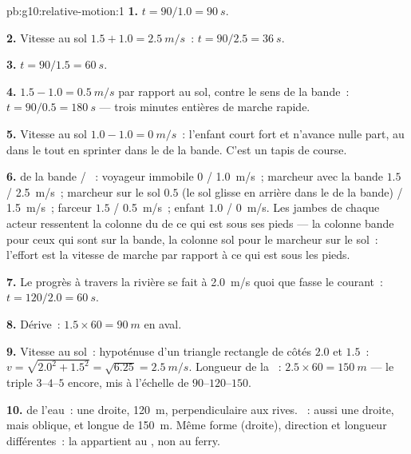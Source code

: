 \begin{solution}{pb:g10:relative-motion:1}
\textbf{1.} $t = 90/1.0 = \qty{90}{s}$.

\textbf{2.} Vitesse au sol $1.5 + 1.0 = \qty{2.5}{m/s}$~:
$t = 90/2.5 = \qty{36}{s}$.

\textbf{3.} $t = 90/1.5 = \qty{60}{s}$.

\textbf{4.} $1.5 - 1.0 = \qty{0.5}{m/s}$ par rapport au sol, contre le
sens de la bande~: $t = 90/0.5 = \qty{180}{s}$ --- trois minutes
entières de marche rapide.

\textbf{5.} Vitesse au sol $1.0 - 1.0 = \qty{0}{m/s}$~: l'enfant court
fort et n'avance nulle part, au  dans le
 tout en sprinter dans le  de
la bande. C'est un tapis de course.

\textbf{6.}  de la bande / ~:
voyageur immobile $0$ / \qty{1.0}{m/s}~; marcheur avec la bande
$1.5$ / \qty{2.5}{m/s}~; marcheur sur le sol $0.5$ (le sol glisse en
arrière dans le  de la bande) / \qty{1.5}{m/s}~; farceur
$1.5$ / \qty{0.5}{m/s}~; enfant $1.0$ / \qty{0}{m/s}. Les jambes de
chaque acteur ressentent la colonne du  de ce qui est sous
ses pieds --- la colonne bande pour ceux qui sont sur la bande, la
colonne sol pour le marcheur sur le sol~: l'effort est la vitesse de
marche par rapport à ce qui est sous les pieds.

\textbf{7.} Le progrès à travers la rivière se fait à \qty{2.0}{m/s}
quoi que fasse le courant~: $t = 120/2.0 = \qty{60}{s}$.

\textbf{8.} Dérive~: $1.5 \times 60 = \qty{90}{m}$ en aval.

\textbf{9.} Vitesse au sol~: hypoténuse d'un triangle rectangle de
côtés $2.0$ et $1.5$~: $v = \sqrt{2.0^2 + 1.5^2} = \sqrt{6.25}
= \qty{2.5}{m/s}$. Longueur de la ~:
$2.5 \times 60 = \qty{150}{m}$ --- le triple $3$--$4$--$5$ encore,
mis à l'échelle de $90$--$120$--$150$.

\textbf{10.}  de l'eau~: une droite, \qty{120}{m},
perpendiculaire aux rives. ~: aussi une
droite, mais oblique, et longue de \qty{150}{m}. Même forme (droite),
direction et longueur différentes~: la
 appartient au , non au ferry.


\end{solution}
